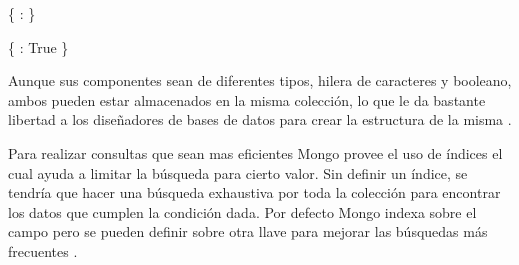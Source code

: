 \documentclass[conference,compsoc]{sty/IEEEtran}
\begin{document}
\{  : \}

\{  : True \}

Aunque sus componentes sean de diferentes tipos, hilera de caracteres y booleano, ambos pueden estar almacenados en la misma colección, lo que le da bastante libertad a los diseñadores de bases de datos para crear la estructura de la misma \cite{Chodorow}.

Para realizar consultas que sean mas eficientes Mongo provee el uso de índices el cual ayuda a limitar la búsqueda para cierto valor. Sin definir un índice, se tendría que hacer una búsqueda exhaustiva por toda la colección para encontrar los datos que cumplen la condición dada. Por defecto Mongo indexa sobre el campo  pero se pueden definir sobre otra llave para mejorar las búsquedas más frecuentes \cite{indiceMongo}. 
\end{document}
